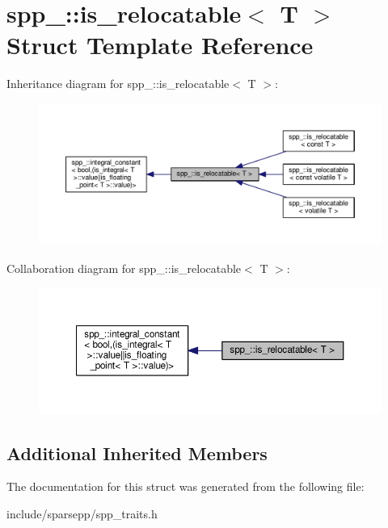 \hypertarget{structspp___1_1is__relocatable}{}\section{spp\+\_\+\+:\+:is\+\_\+relocatable$<$ T $>$ Struct Template Reference}
\label{structspp___1_1is__relocatable}


Inheritance diagram for spp\+\_\+\+:\+:is\+\_\+relocatable$<$ T $>$\+:\nopagebreak
\begin{figure}[H]
\begin{center}
\leavevmode
\includegraphics[width=350pt]{structspp___1_1is__relocatable__inherit__graph}
\end{center}
\end{figure}


Collaboration diagram for spp\+\_\+\+:\+:is\+\_\+relocatable$<$ T $>$\+:\nopagebreak
\begin{figure}[H]
\begin{center}
\leavevmode
\includegraphics[width=350pt]{structspp___1_1is__relocatable__coll__graph}
\end{center}
\end{figure}
\subsection*{Additional Inherited Members}


The documentation for this struct was generated from the following file\+:\begin{DoxyCompactItemize}
\item 
include/sparsepp/spp\+\_\+traits.\+h\end{DoxyCompactItemize}
